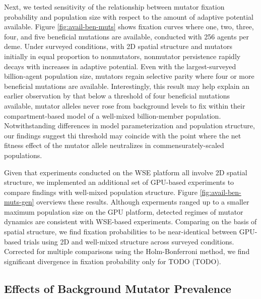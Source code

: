 Next, we tested sensitivity of the relationship between mutator fixation probability and population size with respect to the amount of adaptive potential available.
Figure \ref{fig:avail-ben-muts} shows fixation curves where one, two, three, four, and five beneficial mutations are available, conducted with 256 agents per deme.
Under surveyed conditions, with 2D spatial structure and mutators initially in equal proportion to nonmutators, nonmutator persistence rapidly decays with increases in adaptive potential.
Even with the largest-surveyed billion-agent population size, mutators regain selective parity where four or more beneficial mutations are available.
Interestingly, this result may help explain an earlier observation by \citet{tenaillon1999mutators} that below a threshold of four beneficial mutations available, mutator alleles never rose from background levels to fix within their compartment-based model of a well-mixed billion-member population.
Notwithstanding differences in model parameterization and population structure, our findings suggest thi threshold may coincide with the point where the net fitness effect of the mutator allele neutralizes in commensurately-scaled populations.



Given that experiments conducted on the WSE platform all involve 2D spatial structure, we implemented an additional set of GPU-based experiments to compare findings with well-mixed population structure.
Figure \ref{fig:avail-ben-muts-gen} overviews these results.
Although experments ranged up to a smaller maximum population size on the GPU platform, detected regimes of mutator dynamics are consistent with WSE-based experiments.
Comparing on the basis of spatial structure, we find fixation probabilities to be near-identical between GPU-based trials using 2D and well-mixed structure across surveyed conditions.
Corrected for multiple comparisons using the Holm-Bonferroni method, we find significant divergence in fixation probability only for TODO (TODO).

\subsection{Effects of Background Mutator Prevalence}
\label{sec:background-hypermutator-prevalence}

